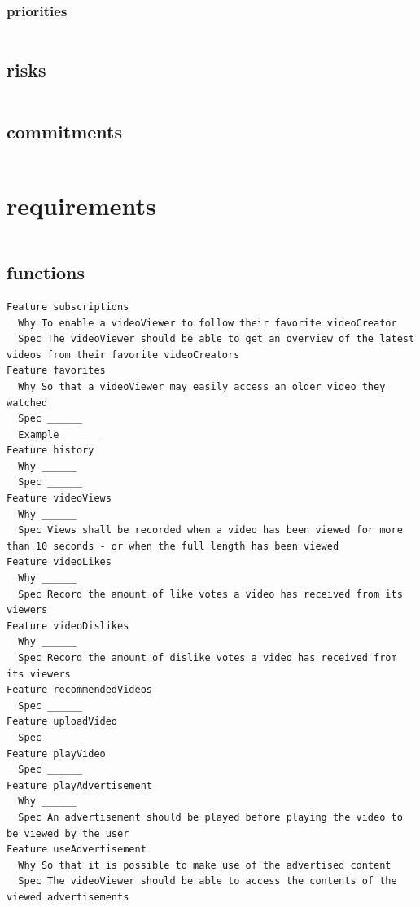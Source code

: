 \documentclass[11pt]{article}
\begin{document}
\begin{framed}
\begin{lstlisting}
\end{lstlisting}
       \subsubsection*{priorities}
\begin{lstlisting}
\end{lstlisting}
       \subsection*{risks}
\begin{lstlisting}
\end{lstlisting}
       \subsection*{commitments}
\begin{lstlisting}
\end{lstlisting}
       \section*{requirements}
\begin{lstlisting}
\end{lstlisting}
       \subsection*{functions}
\begin{lstlisting}
Feature subscriptions
  Why To enable a videoViewer to follow their favorite videoCreator
  Spec The videoViewer should be able to get an overview of the latest videos from their favorite videoCreators
Feature favorites
  Why So that a videoViewer may easily access an older video they watched
  Spec ______
  Example ______
Feature history
  Why ______
  Spec ______
Feature videoViews
  Why ______
  Spec Views shall be recorded when a video has been viewed for more than 10 seconds - or when the full length has been viewed
Feature videoLikes
  Why ______
  Spec Record the amount of like votes a video has received from its viewers
Feature videoDislikes
  Why ______
  Spec Record the amount of dislike votes a video has received from its viewers
Feature recommendedVideos
  Spec ______
Feature uploadVideo
  Spec ______
Feature playVideo
  Spec ______
Feature playAdvertisement
  Why ______
  Spec An advertisement should be played before playing the video to be viewed by the user
Feature useAdvertisement
  Why So that it is possible to make use of the advertised content
  Spec The videoViewer should be able to access the contents of the viewed advertisements
\end{lstlisting}

\end{framed}
\end{document}
